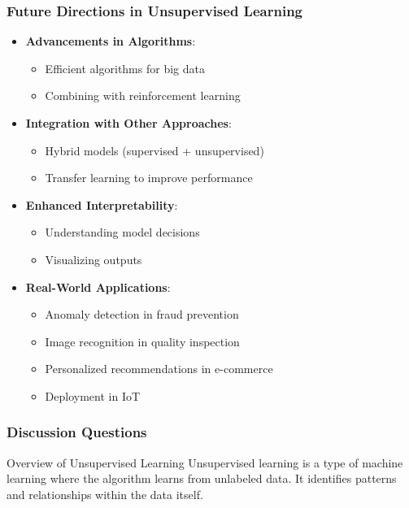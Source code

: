 \documentclass[aspectratio=169]{beamer}
\begin{document}
\begin{frame}[fragile]
    \frametitle{Future Directions in Unsupervised Learning}
    \begin{itemize}
        \item \textbf{Advancements in Algorithms}:
        \begin{itemize}
            \item Efficient algorithms for big data
            \item Combining with reinforcement learning
        \end{itemize}
        \item \textbf{Integration with Other Approaches}:
        \begin{itemize}
            \item Hybrid models (supervised + unsupervised)
            \item Transfer learning to improve performance
        \end{itemize}
        \item \textbf{Enhanced Interpretability}:
        \begin{itemize}
            \item Understanding model decisions
            \item Visualizing outputs
        \end{itemize}
        \item \textbf{Real-World Applications}:
        \begin{itemize}
            \item Anomaly detection in fraud prevention
            \item Image recognition in quality inspection
            \item Personalized recommendations in e-commerce
            \item Deployment in IoT
        \end{itemize}
    \end{itemize}
\end{frame}

\begin{frame}[fragile]
    \frametitle{Discussion Questions}
    \begin{block}{Overview of Unsupervised Learning}
        Unsupervised learning is a type of machine learning where the algorithm learns from unlabeled data. It identifies patterns and relationships within the data itself.
    \end{block}
\end{frame}
\end{document}
